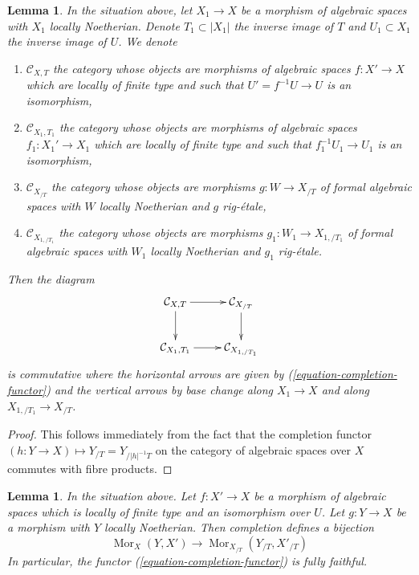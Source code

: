 \documentclass{stacks-project}
\theoremstyle{plain}
\newtheorem{lemma}[subsection]{Lemma}
\theoremstyle{definition}
\theoremstyle{remark}
\numberwithin{equation}{subsection}
\def\Mor{\mathop{\mathrm{Mor}}\nolimits}
\begin{document}
\begin{lemma}
\label{lemma-functoriality-completion-functor}
In the situation above, let $X_1 \to X$ be a morphism of algebraic
spaces with $X_1$ locally Noetherian. Denote $T_1 \subset |X_1|$
the inverse image of $T$ and $U_1 \subset X_1$ the inverse image of $U$.
We denote
\begin{enumerate}
\item $\mathcal{C}_{X, T}$ the category whose objects are
morphisms of algebraic spaces $f : X' \to X$ which are locally
of finite type and such that $U' = f^{-1}U \to U$ is an isomorphism,
\item $\mathcal{C}_{X_1, T_1}$ the category whose objects are
morphisms of algebraic spaces $f_1 : X_1' \to X_1$ which are locally
of finite type and such that $f_1^{-1}U_1 \to U_1$ is an isomorphism,
\item $\mathcal{C}_{X_{/T}}$ the category whose objects are
morphisms $g : W \to X_{/T}$ of formal algebraic spaces
with $W$ locally Noetherian and $g$ rig-\'etale,
\item $\mathcal{C}_{X_{1, /T_1}}$ the category whose objects are
morphisms $g_1 : W_1 \to X_{1, /T_1}$ of formal algebraic spaces
with $W_1$ locally Noetherian and $g_1$ rig-\'etale.
\end{enumerate}
Then the diagram
$$
\xymatrix{
\mathcal{C}_{X, T} \ar[d] \ar[r] &
\mathcal{C}_{X_{/T}} \ar[d] \\
\mathcal{C}_{X_1, T_1} \ar[r] &
\mathcal{C}_{X_{1, /T_1}}
}
$$
is commutative where the horizontal arrows are given by
(\ref{equation-completion-functor})
and the vertical arrows by base change along
$X_1 \to X$ and along $X_{1, /T_1} \to X_{/T}$.
\end{lemma}

\begin{proof}
This follows immediately from the fact that the completion functor
$(h : Y \to X) \mapsto Y_{/T} = Y_{/|h|^{-1}T}$
on the category of algebraic spaces over $X$
commutes with fibre products.
\end{proof}

\begin{lemma}
\label{lemma-completion-functor-fully-faithful}
In the situation above. Let $f : X' \to X$ be a morphism of algebraic spaces
which is locally of finite type and an isomorphism over $U$. Let
$g : Y \to X$ be a morphism with $Y$ locally Noetherian. Then completion
defines a bijection
$$
\Mor_X(Y, X') \longrightarrow \Mor_{X_{/T}}(Y_{/T}, X'_{/T})
$$
In particular, the functor (\ref{equation-completion-functor}) is
fully faithful.
\end{lemma}
\end{document}
